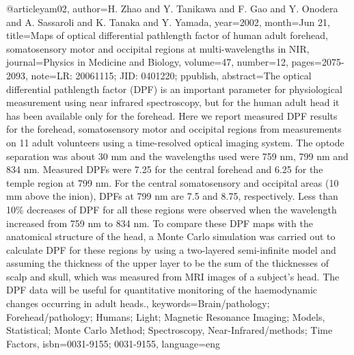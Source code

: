 @article{yam02,
	author={H. Zhao and Y. Tanikawa and F. Gao and Y. Onodera and A. Sassaroli and K. Tanaka and Y. Yamada},
	year={2002},
	month={Jun 21},
	title={Maps of optical differential pathlength factor of human adult forehead, somatosensory motor and occipital regions at multi-wavelengths in NIR},
	journal={Physics in Medicine and Biology},
	volume={47},
	number={12},
	pages={2075-2093},
	note={LR: 20061115; JID: 0401220; ppublish},
	abstract={The optical differential pathlength factor (DPF) is an important parameter for physiological measurement using near infrared spectroscopy, but for the human adult head it has been available only for the forehead. Here we report measured DPF results for the forehead, somatosensory motor and occipital regions from measurements on 11 adult volunteers using a time-resolved optical imaging system. The optode separation was about 30 mm and the wavelengths used were 759 nm, 799 nm and 834 nm. Measured DPFs were 7.25 for the central forehead and 6.25 for the temple region at 799 nm. For the central somatosensory and occipital areas (10 mm above the inion), DPFs at 799 nm are 7.5 and 8.75, respectively. Less than 10\% decreases of DPF for all these regions were observed when the wavelength increased from 759 nm to 834 nm. To compare these DPF maps with the anatomical structure of the head, a Monte Carlo simulation was carried out to calculate DPF for these regions by using a two-layered semi-infinite model and assuming the thickness of the upper layer to be the sum of the thicknesses of scalp and skull, which was measured from MRI images of a subject's head. The DPF data will be useful for quantitative monitoring of the haemodynamic changes occurring in adult heads.},
	keywords={Brain/pathology; Forehead/pathology; Humans; Light; Magnetic Resonance Imaging; Models, Statistical; Monte Carlo Method; Spectroscopy, Near-Infrared/methods; Time Factors},
	isbn={0031-9155; 0031-9155},
	language={eng}
}
